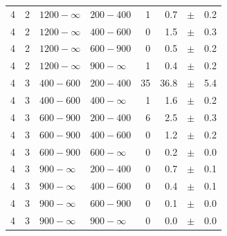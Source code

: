 \begin{table}[!h]
\begin{tabular}{rrllrrcl}
4\T & 2 & $1200- \infty$ & $200-400$ &      1 &      0.7 &$\pm$&    0.2 \\
4 & 2 & $1200- \infty$ & $400-600$ &      0 &      1.5 &$\pm$&    0.3 \\
4 & 2 & $1200- \infty$ & $600-900$ &      0 &      0.5 &$\pm$&    0.2 \\
4 & 2 & $1200- \infty$ & $900-\infty$ &      1 &      0.4 &$\pm$&    0.2 \\
4\T & 3 & $ 400- 600$ & $200-400$ &     35 &     36.8 &$\pm$&    5.4 \\
4 & 3 & $ 400- 600$ & $400-\infty$ &      1 &      1.6 &$\pm$&    0.2 \\
4\T & 3 & $ 600- 900$ & $200-400$ &      6 &      2.5 &$\pm$&    0.3 \\
4 & 3 & $ 600- 900$ & $400-600$ &      0 &      1.2 &$\pm$&    0.2 \\
4 & 3 & $ 600- 900$ & $600-\infty$ &      0 &      0.2 &$\pm$&    0.0 \\
4\T & 3 & $ 900- \infty$ & $200-400$ &      0 &      0.7 &$\pm$&    0.1 \\
4 & 3 & $ 900- \infty$ & $400-600$ &      0 &      0.4 &$\pm$&    0.1 \\
4 & 3 & $ 900- \infty$ & $600-900$ &      0 &      0.1 &$\pm$&    0.0 \\
4 & 3 & $ 900- \infty$ & $900-\infty$ &      0 &      0.0 &$\pm$&    0.0 \\
    \hline
  \end{tabular}
\end{table}

